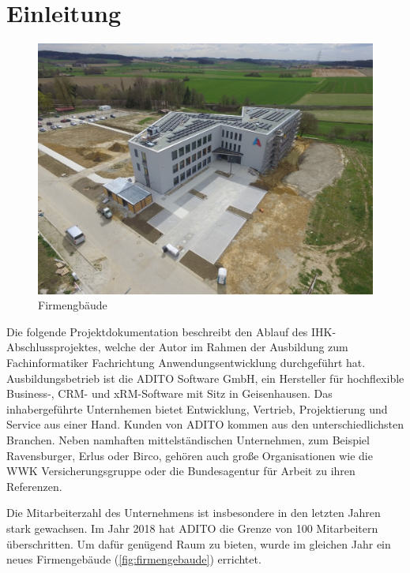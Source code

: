 \setcounter{page}{1}
\section{Einleitung}

\begin{figure}
	\vspace{-12px}
	\centering
	\includegraphics[width=1\linewidth]{../graphic/images/firma/Firmengebaude}
	\caption{Firmengbäude}
	\label{fig:firmengebaude}
\end{figure}

Die folgende Projektdokumentation beschreibt den Ablauf des IHK-Abschlussprojektes, welche der Autor im Rahmen der Ausbildung zum Fachinformatiker Fachrichtung Anwendungsentwicklung
durchgeführt hat. Ausbildungsbetrieb ist die ADITO Software GmbH, ein Hersteller für hochflexible Business-, CRM- und xRM-Software mit Sitz in Geisenhausen. Das inhabergeführte Unternhemen bietet Entwicklung, Vertrieb, Projektierung und Service aus einer Hand. Kunden von ADITO kommen aus den unterschiedlichsten Branchen. Neben namhaften mittelständischen Unternehmen, zum Beispiel Ravensburger, Erlus oder Birco, gehören auch große Organisationen wie die WWK Versicherungsgruppe oder die Bundesagentur für Arbeit zu ihren Referenzen.

Die Mitarbeiterzahl des Unternehmens ist insbesondere in den letzten Jahren stark gewachsen. Im Jahr 2018 hat ADITO die Grenze von 100 Mitarbeitern überschritten. Um dafür genügend Raum zu bieten, wurde im gleichen Jahr ein neues Firmengebäude (\autoref{fig:firmengebaude}) errichtet.

